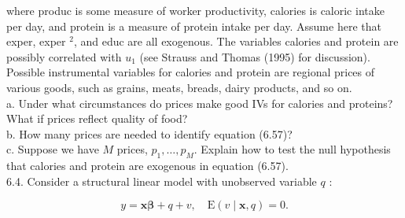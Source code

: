 \documentclass[10pt]{article}
\begin{document}
where produc is some measure of worker productivity, calories is caloric intake per day, and protein is a measure of protein intake per day. Assume here that exper, exper ${ }^{2}$, and educ are all exogenous. The variables calories and protein are possibly correlated with $u_{1}$ (see Strauss and Thomas (1995) for discussion). Possible instrumental variables for calories and protein are regional prices of various goods, such as grains, meats, breads, dairy products, and so on.\\
a. Under what circumstances do prices make good IVs for calories and proteins? What if prices reflect quality of food?\\
b. How many prices are needed to identify equation (6.57)?\\
c. Suppose we have $M$ prices, $p_{1}, \ldots, p_{M}$. Explain how to test the null hypothesis that calories and protein are exogenous in equation (6.57).\\
6.4. Consider a structural linear model with unobserved variable $q$ :

$$
y=\mathbf{x} \boldsymbol{\beta}+q+v, \quad \mathrm{E}(v \mid \mathbf{x}, q)=0 .
$$
\end{document}

